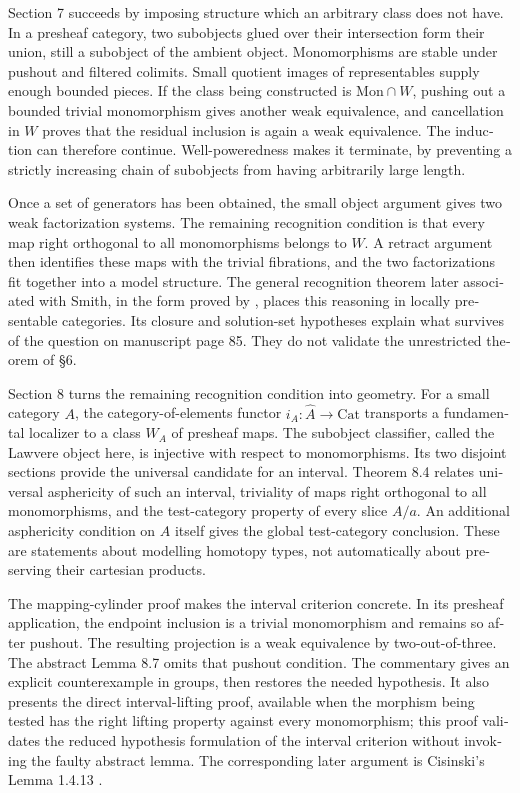\begin{otherlanguage}{english}
\begin{otherlanguage}{english}
Section 7 succeeds by imposing structure which an arbitrary class does not have. In a presheaf category, two subobjects glued over their intersection form their union, still a subobject of the ambient object. Monomorphisms are stable under pushout and filtered colimits. Small quotient images of representables supply enough bounded pieces. If the class being constructed is $\mathrm{Mon}\cap W$, pushing out a bounded trivial monomorphism gives another weak equivalence, and cancellation in $W$ proves that the residual inclusion is again a weak equivalence. The induction can therefore continue. Well-poweredness makes it terminate, by preventing a strictly increasing chain of subobjects from having arbitrarily large length.

Once a set of generators has been obtained, the small object argument gives two weak factorization systems. The remaining recognition condition is that every map right orthogonal to all monomorphisms belongs to $W$. A retract argument then identifies these maps with the trivial fibrations, and the two factorizations fit together into a model structure. The general recognition theorem later associated with Smith, in the form proved by \citet[Theorem 1.7]{Beke2000}, places this reasoning in locally presentable categories. Its closure and solution-set hypotheses explain what survives of the question on manuscript page 85. They do not validate the unrestricted theorem of \S6.

Section 8 turns the remaining recognition condition into geometry. For a small category $A$, the category-of-elements functor $i_A:\widehat A\to\mathrm{Cat}$ transports a fundamental localizer to a class $W_A$ of presheaf maps. The subobject classifier, called the Lawvere object here, is injective with respect to monomorphisms. Its two disjoint sections provide the universal candidate for an interval. Theorem 8.4 relates universal asphericity of such an interval, triviality of maps right orthogonal to all monomorphisms, and the test-category property of every slice $A/a$. An additional asphericity condition on $A$ itself gives the global test-category conclusion. These are statements about modelling homotopy types, not automatically about preserving their cartesian products.

The mapping-cylinder proof makes the interval criterion concrete. In its presheaf application, the endpoint inclusion is a trivial monomorphism and remains so after pushout. The resulting projection is a weak equivalence by two-out-of-three. The abstract Lemma 8.7 omits that pushout condition. The commentary gives an explicit counterexample in groups, then restores the needed hypothesis. It also presents the direct interval-lifting proof, available when the morphism being tested has the right lifting property against every monomorphism; this proof validates the reduced hypothesis formulation of the interval criterion without invoking the faulty abstract lemma. The corresponding later argument is Cisinski's Lemma 1.4.13 \citep{Cisinski2006}.


\end{otherlanguage}
\end{otherlanguage}

